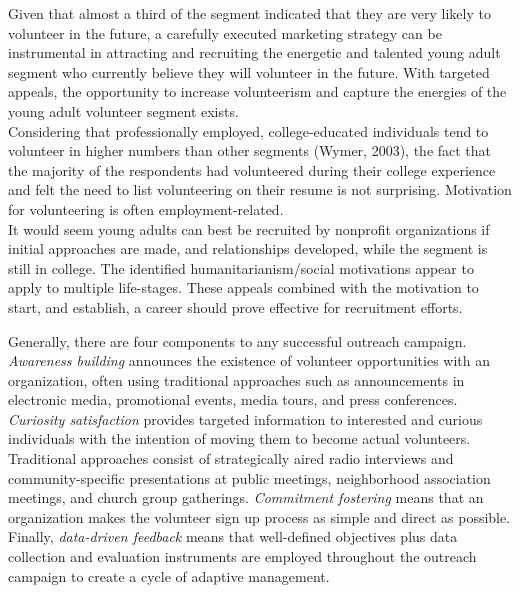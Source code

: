 \documentclass[11pt,fleqn]{book} %
\begin{document}
Given that almost a third
of the segment indicated that they are very likely to volunteer in the future, a
carefully executed marketing strategy can be instrumental in attracting and
recruiting the energetic and talented young adult segment who currently
believe they will volunteer in the future. With targeted appeals, the
opportunity to increase volunteerism and capture the energies of the young
adult volunteer segment exists.\\

Considering that professionally employed, college-educated individuals tend
to volunteer in higher numbers than other segments (Wymer, 2003), the fact
that the majority of the respondents had volunteered during their college
experience and felt the need to list volunteering on their resume is not
surprising. Motivation for volunteering is often employment-related.\\

It
would seem young adults can best be recruited by nonprofit organizations if
initial approaches are made, and relationships developed, while the segment
is still in college. The identified humanitarianism/social motivations appear
to apply to multiple life-stages. These appeals combined with the motivation
to start, and establish, a career should prove effective for recruitment efforts.




Generally, there are four components to any successful outreach campaign. \textit{Awareness building} announces the existence of volunteer opportunities with an organization, often using traditional approaches such as announcements in electronic media, promotional events, media tours, and press conferences. \textit{Curiosity satisfaction} provides targeted information to interested and curious individuals with the intention of moving them to become actual volunteers. Traditional approaches consist of strategically aired radio interviews and community-specific presentations at public meetings, neighborhood association meetings, and church group gatherings. \textit{Commitment fostering} means that an organization makes the volunteer sign up process as simple and direct as possible. Finally, \textit{data-driven feedback} means that well-defined objectives plus data collection and evaluation instruments are employed throughout the outreach campaign to create a cycle of adaptive management. 






          

\printbibliography
\end{document}
